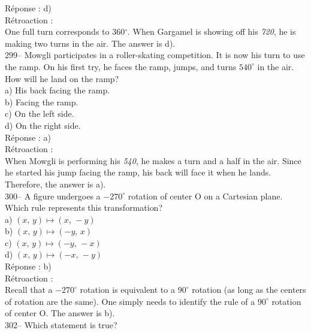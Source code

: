 \documentclass[letterpaper, 12pt]{article}
\begin{document}
R\'eponse : d)\\

R\'etroaction :\\
One full turn corresponds to 360$^{\circ}$.  When Gargamel is
showing off his \emph{720}, he is making two turns in the air. The answer is d).\\

299-- Mowgli participates in a roller-skating competition. It is now
his turn to use the ramp. On his first try, he faces the ramp,
jumps, and turns $540^{\circ}$ in the air. How will he land on the
ramp?\\

a) His back facing the ramp.\\
b) Facing the ramp.\\
c) On the left side.\\
d) On the right side.\\

R\'eponse : a)\\

R\'etroaction :\\
When Mowgli is performing his \emph{540},  he makes a turn and a half in
the air. Since he started his jump facing the ramp, his back will
face it when he lands. Therefore, the answer is a).\\

300-- A figure undergoes a $-270^{\circ}$ rotation of center O on a Cartesian plane. Which rule represents this transformation?\\

a) $\left( x,\,y\right) \longmapsto \left(x,\,-y \right)$\\
b) $\left( x,\,y\right) \longmapsto \left(-y,\,x \right)$\\
c) $\left( x,\,y\right) \longmapsto \left(-y,\,-x \right)$\\
d) $\left( x,\,y\right) \longmapsto \left(-x,\,-y \right)$\\

R\'eponse : b)\\

R\'etroaction :\\
Recall that a $-270^{\circ}$ rotation is equivalent to a $90^{\circ}$ rotation (as long as the centers of rotation are the same). One simply needs to identify the rule of a $90^{\circ}$ rotation of center O. The answer is b).\\


302-- Which statement is true?\\
\end{document}
